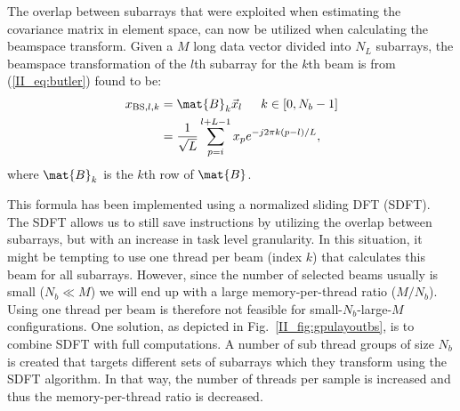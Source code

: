 The overlap between subarrays that were exploited when estimating the covariance matrix in element space, can now be utilized when calculating the beamspace transform. 
Given a $M$ long data vector divided into $N_L$ subarrays, the beamspace transformation of the $l$th subarray for the $k$th beam is from (\ref{II_eq:butler}) found to be:
\begin{align}\label{II_eq:bs_formula}
x_{\text{BS},l,k} &= \mat{B}_k\vec{x}_l \,\,\,\,\,\,\,\,\, k \in [0, N_b-1] \\
&= \frac{1}{\sqrt{L}}\sum_{p=i}^{l+L-1}x_p e^{-j2\pi k(p-l)/L},
\end{align}
where $\mat{B}_k$ is the $k$th row of $\mat{B}$. %

This formula has been implemented using a normalized sliding DFT (SDFT)\cite{Lyons2003}.
The SDFT allows us to still save instructions by utilizing the overlap between subarrays, but with an increase in task level granularity. In this situation, it might be tempting to use one thread per beam (index $k$) that calculates this beam for all subarrays. However, since the number of selected beams usually is small ($N_b \ll M$) we will end up with a large memory-per-thread ratio ($M/N_b$). Using one thread per beam is therefore not feasible for small-$N_b$-large-$M$ configurations. One solution, as depicted in Fig.\ \ref{II_fig:gpulayoutbs}, is to combine SDFT with full computations. A number of sub thread groups of size $N_b$ is created that targets different sets of subarrays which they transform using the SDFT algorithm. In that way, the number of threads per sample is increased and thus the memory-per-thread ratio is decreased. 

